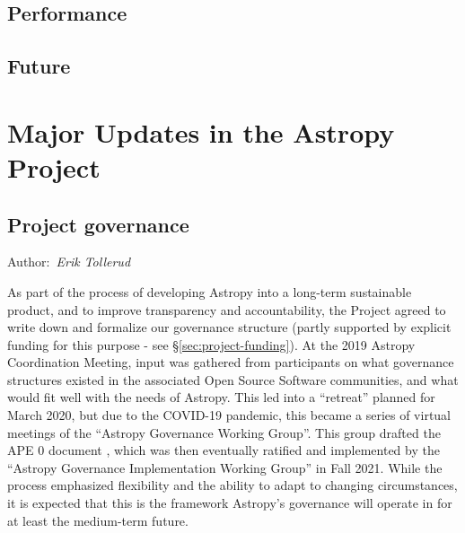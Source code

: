 \documentclass[modern]{aastex631}
\newcommand{\secauthor}[1]{{\color{blue}Author:~\textit{#1}}}
\begin{document}
\subsection*{Performance} \label{sec:core-features-performance}



\subsection*{Future} \label{sec:core-features-future}



\section{Major Updates in the Astropy Project} \label{sec:project-updates}

\subsection{Project governance} \label{sec:project-governance}

\secauthor{Erik Tollerud}


As part of the process of developing Astropy into a long-term sustainable
product, and to improve transparency and accountability, the Project agreed to
write down and formalize our governance structure (partly supported by explicit
funding for this purpose - see \S \ref{sec:project-funding}). At the 2019
Astropy Coordination Meeting, input was gathered from participants on what governance
structures existed in the associated Open Source Software communities, and what
would fit well with the needs of Astropy. This led into a ``retreat'' planned
for March 2020, but due to the COVID-19 pandemic, this became a series of
virtual meetings of the ``Astropy Governance Working Group''.  This group
drafted the APE 0 document \citep{ape0}, which was then eventually ratified and
implemented by the ``Astropy Governance Implementation Working Group'' in Fall
2021. While the process emphasized flexibility and the ability to adapt to
changing circumstances, it is expected that this is the framework Astropy's
governance will operate in for at least the medium-term future.
\end{document}
